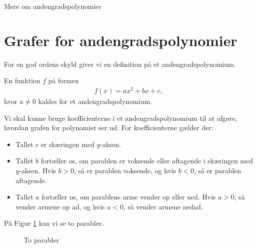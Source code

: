 \begin{center}
\Huge
Mere om andengradspolynomier
\end{center}
\section*{Grafer for andengradspolynomier}


For en god ordens skyld giver vi en definition på et andengradspolynomium.
\begin{defn}[Andengradspolynomium]
	En funktion $f$ på formen
	\begin{align*}
		f(x) = ax^2+bx+c,
	\end{align*}
	hvor $a \neq 0$ kaldes for et andengradspolynomium.
\end{defn}
Vi skal kunne bruge koefficienterne i et andengradspolynomium til at afgøre, hvordan grafen for polynomiet ser ud. For koefficienterne gælder der:
\begin{itemize}
	\item[$\cdot$] Tallet $c$ er skæringen med $y$-aksen.
	\item[$\cdot$] Tallet $b$ fortæller os, om parablen er voksende eller aftagende i skæringen
	med $y$-aksen. Hvis $b > 0$, så er parablen voksende, og hvis $b<0$, så er parablen 
	aftagende.
	\item[$\cdot$] Tallet $a$ fortæller os, om parablens arme vender op eller ned. Hvis 
	$a > 0$, så vender armene op ad, og hvis $a < 0$, så vender armene nedad. 
\end{itemize}
På Figur \ref{fig:andenpolys2} kan vi se to parabler. 
\begin{figure}[H]
	\centering
	\resizebox{0.45\textwidth}{!}
	{
	}
	\resizebox{0.45\textwidth}{!}
	{
	}
	\caption{To parabler}
	\label{fig:andenpolys2}
\end{figure}

